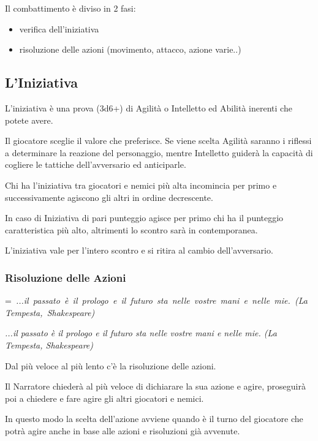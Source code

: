 \documentclass[a4paper,11pt,twoside,openany]{book}
\makeatletter
\newcommand{\mybox}[1]{%
	\setbox0=\hbox{#1}%
	\setlength{\@tempdima}{\dimexpr\wd0+13pt}%
	\begin{tcolorbox}[boxrule=0.5pt,arc=4pt, breakable,enhanced,
		left=6pt,right=6pt,top=6pt,bottom=6pt,boxsep=0pt,width=\@tempdima]
		#1
	\end{tcolorbox}
}
\makeatother
\begin{document}
\bigskip

Il combattimento è diviso in 2 fasi:
\begin{itemize}
\item verifica dell'iniziativa 
\item risoluzione delle azioni (movimento, attacco, azione varie..) 
\end{itemize}

\subsection{L'Iniziativa}

\label{liniziativa}

L'iniziativa è una prova (3d6+) di Agilità o Intelletto ed Abilità inerenti che potete avere.

Il giocatore sceglie il valore che preferisce. Se viene scelta Agilità saranno i riflessi a determinare la reazione del personaggio, mentre Intelletto guiderà la capacità di cogliere le tattiche dell'avversario ed anticiparle.

Chi ha l'iniziativa tra giocatori e nemici più alta incomincia per primo e successivamente agiscono gli altri in ordine decrescente. 

In caso di Iniziativa di pari punteggio agisce per primo chi ha il punteggio caratteristica più alto, altrimenti lo scontro sarà in contemporanea.

L'iniziativa vale per l'intero scontro e si ritira al cambio dell'avversario.

\subsubsection{Risoluzione delle Azioni}

\mybox{\textit{
...il passato è il prologo e il futuro sta nelle vostre mani e nelle mie. (La Tempesta, Shakespeare)
}}\medskip


\label{risoluzione-delle-azioni}

Dal più veloce al più lento c'è la risoluzione delle azioni.

Il Narratore chiederà al più veloce di dichiarare la sua azione e agire, proseguirà poi a chiedere e fare agire gli altri giocatori e nemici.

In questo modo la scelta dell'azione avviene quando è il turno del giocatore che potrà agire anche in base alle azioni e risoluzioni già avvenute.
\end{document}
